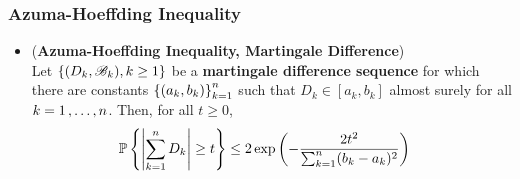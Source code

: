 \documentclass[11pt]{article}
\begin{document}
\subsubsection{Azuma-Hoeffding Inequality}
\begin{itemize}
\item \begin{corollary} (\textbf{Azuma-Hoeffding Inequality, Martingale Difference})\citep{wainwright2019high}\\
Let $\left\{(D_k, {\mathscr B}_k), k \ge 1\right\}$ be a \textbf{martingale difference sequence} for which there are constants $\left\{(a_k, b_k)\right\}^{n}_{k=1}$ such that $D_k \in [a_k, b_k]$ almost surely for all $k = 1 \,{,}\ldots{,}\, n$. Then, for all $t \ge 0$,
\begin{align}
{\mathbb P}\left\{\left\lvert \sum_{k=1}^{n}D_k \right\rvert \ge t \right\} &\le  2 \exp\left(- \frac{2 t^2}{ \sum_{k=1}^{n}(b_k - a_k)^2}\right) \label{ineqn: hoeffding_inequality_martingale}
\end{align}
\end{corollary}
\end{itemize}
\end{document}

